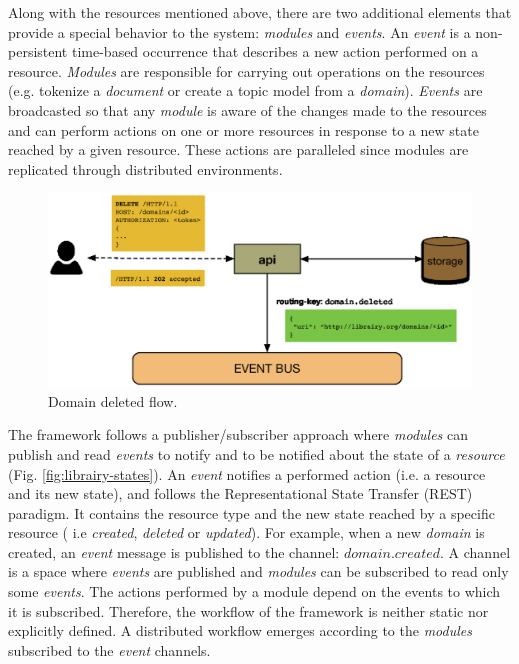 Along with the resources mentioned above, there are two additional elements that provide a special behavior to the system: \textit{modules} and \textit{events}. An \textit{event} is a non-persistent time-based occurrence that describes a new action performed on a resource. \textit{Modules} are responsible for carrying out operations on the resources (e.g. tokenize a \textit{document} or create a topic model from a \textit{domain}). \textit{Events} are broadcasted so that any \textit{module} is aware of the changes made to the resources and  can perform actions on one or more resources in response to a new state reached by a given resource. These actions are paralleled since modules are replicated through distributed environments.

\begin{figure}
  \center
  \includegraphics[scale=0.45]{api-domain-deleted}
  \caption{Domain deleted flow.}
  \label{fig:librairy-domain-deleted}
\end{figure}


The framework follows a publisher/subscriber approach where \textit{modules} can publish and read \textit{events} to notify and to be notified about the state of a \textit{resource} (Fig. \ref{fig:librairy-states}). An \textit{event} notifies a performed action (i.e. a resource and its new state), and follows the Representational State Transfer (REST)\cite{Fielding2002} paradigm. It contains the resource type and the new state reached by a specific resource ( i.e \textit{created}, \textit{deleted} or \textit{updated}). For example, when a new \textit{domain} is created, an \textit{event} message is published to the channel: $domain.created$. A channel is a space where \textit{events} are published and \textit{modules} can be subscribed to read only some \textit{events}. The actions performed by a module depend on the events to which it is subscribed. Therefore, the workflow of the framework is neither static nor explicitly defined. A distributed workflow emerges according to the \textit{modules} subscribed to the \textit{event} channels.

